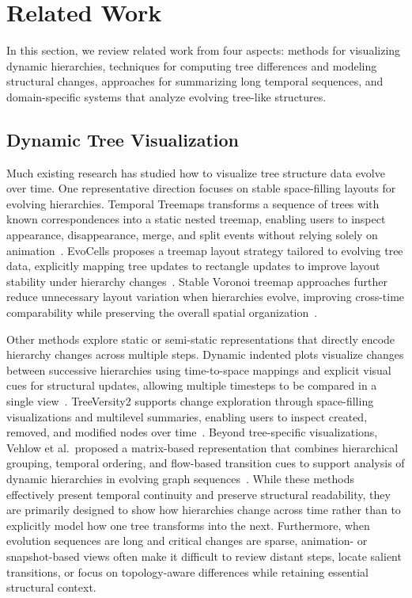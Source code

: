 \section{Related Work}
In this section, we review related work from four aspects: methods for visualizing dynamic hierarchies, techniques for computing tree differences and modeling structural changes, approaches for summarizing long temporal sequences, and domain-specific systems that analyze evolving tree-like structures. 

\subsection{Dynamic Tree Visualization}


Much existing research has studied how to visualize tree structure data evolve over time.  One  representative direction focuses on stable space-filling layouts for evolving hierarchies. Temporal Treemaps transforms a sequence of trees with known correspondences into a static nested treemap, enabling users to inspect appearance, disappearance, merge, and split events without relying solely on animation~\cite{Kopp2018TemporalTreemaps}. EvoCells proposes a treemap layout strategy tailored to evolving tree data, explicitly mapping tree updates to rectangle updates to improve layout stability under hierarchy changes~\cite{Scheibel2018EvoCells}. Stable Voronoi treemap approaches further reduce unnecessary layout variation when hierarchies evolve, improving cross-time comparability while preserving the overall spatial organization~\cite{Hahn2014StableVoronoiTreemaps}.

Other methods explore static or semi-static representations that directly encode hierarchy changes across multiple steps. Dynamic indented plots visualize changes between successive hierarchies using time-to-space mappings and explicit visual cues for structural updates, allowing multiple timesteps to be compared in a single view~\cite{Burch2014DynamicIndentedPlots}. TreeVersity2 supports change exploration through space-filling visualizations and multilevel summaries, enabling users to inspect created, removed, and modified nodes over time~\cite{GuerraGomez2013TreeVersity2}. Beyond tree-specific visualizations, Vehlow et al.\ proposed a matrix-based representation that combines hierarchical grouping, temporal ordering, and flow-based transition cues to support analysis of dynamic hierarchies in evolving graph sequences~\cite{Vehlow2016DynamicHierarchiesGraphSequences}. While these methods effectively present temporal continuity and preserve structural readability, they are primarily designed to show how hierarchies change across time rather than to explicitly model how one tree transforms into the next. Furthermore, when evolution sequences are long and critical changes are sparse, animation- or snapshot-based views often make it difficult to review distant steps, locate salient transitions, or focus on topology-aware differences while retaining essential structural context.



